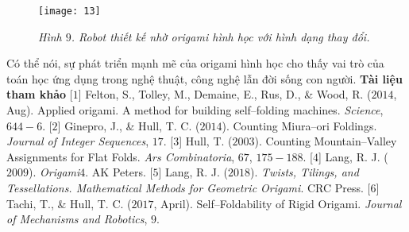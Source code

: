 \begin{multicols}{2}
\begin{figure}[H]
		\texttt{[image: 13]}
		\caption{\small\textit{\color{duongvaotoanhoc}Hình $9$. Robot thiết kế nhờ origami hình học với hình dạng thay đổi.}}
		\vspace*{-10pt}
	\end{figure}
	Có thể nói, sự phát triển mạnh mẽ của \linebreak origami hình học cho thấy vai trò của toán học ứng dụng trong nghệ thuật, công nghệ lẫn đời sống con người.
	\vskip 0.05cm
	\textbf{\color{toanhocdoisong}Tài liệu tham khảo}
	\vskip 0.05cm
	[$1$] Felton, S., Tolley, M., Demaine, E., Rus, D., \& Wood, R. ($2014$, Aug). Applied origami. A method for building self--folding machines. \textit{Science}, $644-6$.
	\vskip 0.05cm
	[$2$] Ginepro, J., \& Hull, T. C. ($2014$). Counting Miura--ori Foldings. \textit{Journal of Integer Sequences}, $17$.
	\vskip 0.05cm
	[$3$] Hull, T. ($2003$). Counting Mountain--Valley Assignments for Flat Folds. \textit{Ars Combinatoria}, $67$, $175-188$.
	\vskip 0.05cm
	[$4$] Lang, R. J. ($2009$). \textit{Origami$4$}. AK Peters.
	\vskip 0.05cm
	[$5$] Lang, R. J. ($2018$). \textit{Twists, Tilings, and Tessellations. Mathematical Methods for Geometric Origami}. CRC Press.
	\vskip 0.05cm
	[$6$] Tachi, T., \& Hull, T. C. ($2017$, April). Self--Foldability of Rigid Origami. \textit{Journal of Mechanisms and Robotics}, $9$.
\end{multicols}
